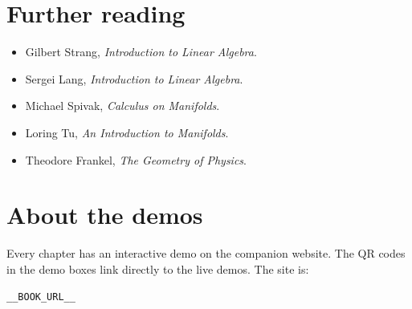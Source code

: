 \documentclass[10pt,oneside]{book}
\begin{document}
\chapter{Further reading}
\begin{itemize}
\item Gilbert Strang, \emph{Introduction to Linear Algebra}.
\item Sergei Lang, \emph{Introduction to Linear Algebra}.
\item Michael Spivak, \emph{Calculus on Manifolds}.
\item Loring Tu, \emph{An Introduction to Manifolds}.
\item Theodore Frankel, \emph{The Geometry of Physics}.
\end{itemize}

\chapter{About the demos}
Every chapter has an interactive demo on the companion website.
The QR codes in the demo boxes link directly to the live demos.
The site is:

\begin{center}
\texttt{__BOOK_URL__}
\end{center}
\end{document}
